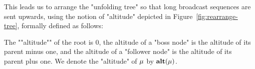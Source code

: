 This leads us to arrange the "unfolding tree" so that long broadcast sequences are sent upwards, using the notion of "altitude" depicted in Figure~\ref{fig:rearrange-tree}, formally defined as follows:

The ""altitude"" of the root is $0$, the altitude of a "boss node" is the altitude of its parent minus one, and the altitude of a "follower node" is the altitude of its parent plus one.
We denote the "altitude" of $\mu$ by $\mathbf{alt}(\mu)$.















%
%

